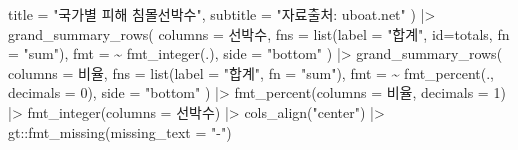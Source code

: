 \documentclass[
  letterpaper,
  chapter,a4paper,showtrims,openright,hidelinks]{oblivoir}
\newenvironment{Shaded}{\begin{snugshade}}{\end{snugshade}}
\newcommand{\AttributeTok}[1]{\textcolor[rgb]{0.40,0.45,0.13}{#1}}
\newcommand{\DecValTok}[1]{\textcolor[rgb]{0.68,0.00,0.00}{#1}}
\newcommand{\FunctionTok}[1]{\textcolor[rgb]{0.28,0.35,0.67}{#1}}
\newcommand{\NormalTok}[1]{\textcolor[rgb]{0.00,0.23,0.31}{#1}}
\newcommand{\SpecialCharTok}[1]{\textcolor[rgb]{0.37,0.37,0.37}{#1}}
\newcommand{\StringTok}[1]{\textcolor[rgb]{0.13,0.47,0.30}{#1}}
\begin{document}
\begin{Shaded}
\begin{Highlighting}[]
      \AttributeTok{title =} \StringTok{"국가별 피해 침몰선박수"}\NormalTok{, }
      \AttributeTok{subtitle =} \StringTok{"자료출처: uboat.net"}
\NormalTok{    ) }\SpecialCharTok{|\textgreater{}} 
      \FunctionTok{grand\_summary\_rows}\NormalTok{(}
        \AttributeTok{columns =}\NormalTok{ 선박수,}
        \AttributeTok{fns =}  \FunctionTok{list}\NormalTok{(}\AttributeTok{label =} \StringTok{"합계"}\NormalTok{, }\AttributeTok{id=}\StringTok{\textquotesingle{}totals\textquotesingle{}}\NormalTok{, }\AttributeTok{fn =} \StringTok{"sum"}\NormalTok{),}
        \AttributeTok{fmt =} \SpecialCharTok{\textasciitilde{}} \FunctionTok{fmt\_integer}\NormalTok{(.),}
        \AttributeTok{side =} \StringTok{"bottom"}
\NormalTok{      ) }\SpecialCharTok{|\textgreater{}} 
      \FunctionTok{grand\_summary\_rows}\NormalTok{(}
        \AttributeTok{columns =}\NormalTok{ 비율,}
        \AttributeTok{fns =}  \FunctionTok{list}\NormalTok{(}\AttributeTok{label =} \StringTok{"합계"}\NormalTok{, }\AttributeTok{fn =} \StringTok{"sum"}\NormalTok{),}
        \AttributeTok{fmt =} \SpecialCharTok{\textasciitilde{}} \FunctionTok{fmt\_percent}\NormalTok{(., }\AttributeTok{decimals =} \DecValTok{0}\NormalTok{),}
        \AttributeTok{side =} \StringTok{"bottom"}
\NormalTok{      ) }\SpecialCharTok{|\textgreater{}} 
      \FunctionTok{fmt\_percent}\NormalTok{(}\AttributeTok{columns =}\NormalTok{ 비율, }\AttributeTok{decimals =} \DecValTok{1}\NormalTok{) }\SpecialCharTok{|\textgreater{}} 
      \FunctionTok{fmt\_integer}\NormalTok{(}\AttributeTok{columns =}\NormalTok{ 선박수) }\SpecialCharTok{|\textgreater{}} 
      \FunctionTok{cols\_align}\NormalTok{(}\StringTok{"center"}\NormalTok{) }\SpecialCharTok{|\textgreater{}} 
\NormalTok{      gt}\SpecialCharTok{::}\FunctionTok{fmt\_missing}\NormalTok{(}\AttributeTok{missing\_text =} \StringTok{"{-}"}\NormalTok{)}
\end{Highlighting}
\end{Shaded}
\end{document}
